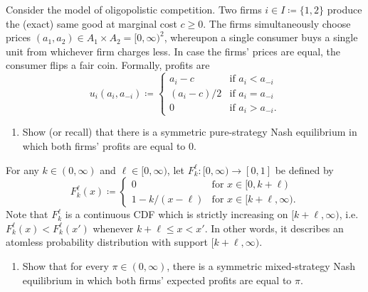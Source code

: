 \begin{exercise}
	\label{exercise:bertrand_collusion}
	Consider the \textcite{Bertrand1883} model of oligopolistic competition. Two firms $i \in I \coloneqq \{1,2\}$ produce the (exact) same good at marginal cost $c \geq 0$. The firms simultaneously choose prices $(a_1,a_2) \in A_1 \times A_2 = [0,\infty)^2$, whereupon a single consumer buys a single unit from whichever firm charges less. In case the firms' prices are equal, the consumer flips a fair coin. Formally, profits are
	\begin{equation*}
		u_i(a_i,a_{-i})
		\coloneqq
		\begin{cases}
			a_i-c & \text{if $a_i < a_{-i}$} \\
			(a_i-c)/2 & \text{if $a_i = a_{-i}$} \\
			0 & \text{if $a_i > a_{-i}$.} 
		\end{cases}
	\end{equation*}

	\begin{enumerate}[label=(\alph*)]

		\item Show (or recall) that there is a symmetric pure-strategy Nash equilibrium in which both firms' profits are equal to $0$.

	\end{enumerate}

	For any $k \in (0,\infty)$ and $\ell \in [0,\infty)$, let $F_k^\ell : [0,\infty) \to [0,1]$ be defined by
	\begin{equation*}
		F_k^\ell(x) \coloneqq
		\begin{cases}
			0 & \text{for $x \in [0,k+\ell)$} \\
			1 - k/(x-\ell) & \text{for $x \in [k+\ell,\infty)$.}
		\end{cases}
	\end{equation*}
	Note that $F_k^\ell$ is a continuous CDF which is strictly increasing on $[k+\ell,\infty)$, i.e. $F_k^\ell(x) < F_k^\ell(x')$ whenever $k+\ell \leq x < x'$. In other words, it describes an atomless probability distribution with support $[k+\ell,\infty)$.

	\begin{enumerate}[label=(\alph*),resume]

		\item Show that for every $\pi \in (0,\infty)$, there is a symmetric mixed-strategy Nash equilibrium in which both firms' expected profits are equal to $\pi$.


\end{enumerate}
\end{exercise}
